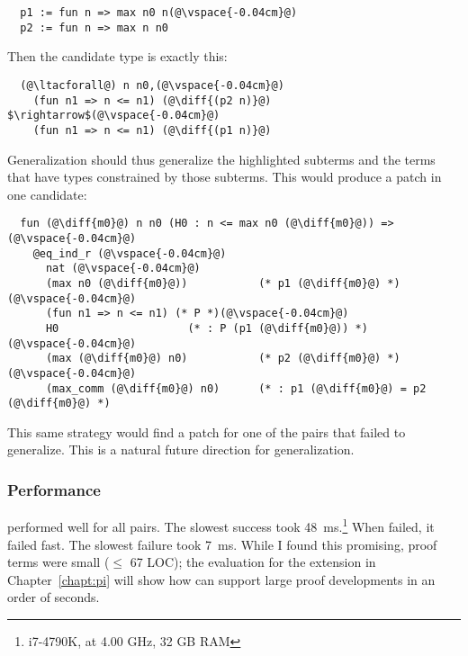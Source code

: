 \begin{lstlisting}
  p1 := fun n => max n0 n(@\vspace{-0.04cm}@)
  p2 := fun n => max n n0
\end{lstlisting}
Then the candidate type is exactly this:

\begin{lstlisting}
  (@\ltacforall@) n n0,(@\vspace{-0.04cm}@)
    (fun n1 => n <= n1) (@\diff{(p2 n)}@) $\rightarrow$(@\vspace{-0.04cm}@)
    (fun n1 => n <= n1) (@\diff{(p1 n)}@)
\end{lstlisting}
Generalization should thus generalize the highlighted subterms and the
terms that have types constrained by those subterms.
This would produce a patch in one candidate:

\begin{lstlisting}
  fun (@\diff{m0}@) n n0 (H0 : n <= max n0 (@\diff{m0}@)) =>(@\vspace{-0.04cm}@)
    @eq_ind_r (@\vspace{-0.04cm}@)
      nat (@\vspace{-0.04cm}@)
      (max n0 (@\diff{m0}@))           (* p1 (@\diff{m0}@) *)(@\vspace{-0.04cm}@)
      (fun n1 => n <= n1) (* P *)(@\vspace{-0.04cm}@)
      H0                    (* : P (p1 (@\diff{m0}@)) *)(@\vspace{-0.04cm}@)
      (max (@\diff{m0}@) n0)           (* p2 (@\diff{m0}@) *)(@\vspace{-0.04cm}@)
      (max_comm (@\diff{m0}@) n0)      (* : p1 (@\diff{m0}@) = p2 (@\diff{m0}@) *)
\end{lstlisting}
This same strategy would find a patch for one of the pairs that \sysname failed to generalize.
This is a natural future direction for generalization.

\subsubsection{Performance}
\label{sec:perf}

\sysname performed well for all pairs. The slowest success took \SI{48}{\ms}.\footnote{i7-4790K, at 4.00 GHz, 32 GB RAM}
When \sysname failed, it failed fast. The slowest failure took \SI{7}{\ms}.
While I found this promising, proof terms were small ($\le$ 67 LOC);
the evaluation for the \toolnamec extension in Chapter~\ref{chapt:pi} will show
how \sysnamelong can support large proof developments in an order of seconds.



